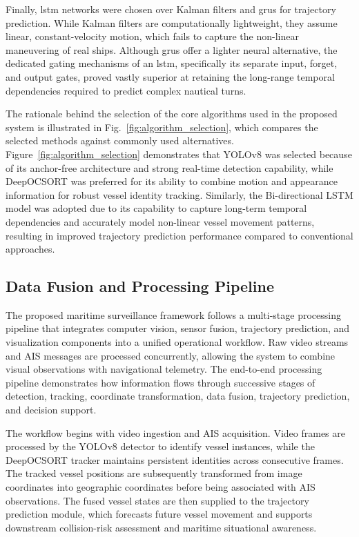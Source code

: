 Finally, \gls{lstm} networks were chosen over Kalman filters and \glspl{gru} for trajectory prediction. While Kalman filters are computationally lightweight, they assume linear, constant-velocity motion, which fails to capture the non-linear maneuvering of real ships. Although \glspl{gru} offer a lighter neural alternative, the dedicated gating mechanisms of an \gls{lstm}, specifically its separate input, forget, and output gates, proved vastly superior at retaining the long-range temporal dependencies required to predict complex nautical turns. 
\begin{reportfigblock}
The rationale behind the selection of the core algorithms used in the proposed system is illustrated in Fig.~\ref{fig:algorithm_selection}, which compares the selected methods against commonly used alternatives.
Figure~\ref{fig:algorithm_selection} demonstrates that YOLOv8 was selected because of its anchor-free architecture and strong real-time detection capability, while DeepOCSORT was preferred for its ability to combine motion and appearance information for robust vessel identity tracking. Similarly, the Bi-directional LSTM model was adopted due to its capability to capture long-term temporal dependencies and accurately model non-linear vessel movement patterns, resulting in improved trajectory prediction performance compared to conventional approaches.
\end{reportfigblock}



\subsection{Data Fusion and Processing Pipeline}

The proposed maritime surveillance framework follows a multi-stage processing pipeline that integrates computer vision, sensor fusion, trajectory prediction, and visualization components into a unified operational workflow. Raw video streams and AIS messages are processed concurrently, allowing the system to combine visual observations with navigational telemetry. The end-to-end processing pipeline demonstrates how information flows through successive stages of detection, tracking, coordinate transformation, data fusion, trajectory prediction, and decision support.

The workflow begins with video ingestion and AIS acquisition. Video frames are processed by the YOLOv8 detector to identify vessel instances, while the DeepOCSORT tracker maintains persistent identities across consecutive frames. The tracked vessel positions are subsequently transformed from image coordinates into geographic coordinates before being associated with AIS observations. The fused vessel states are then supplied to the trajectory prediction module, which forecasts future vessel movement and supports downstream collision-risk assessment and maritime situational awareness.


